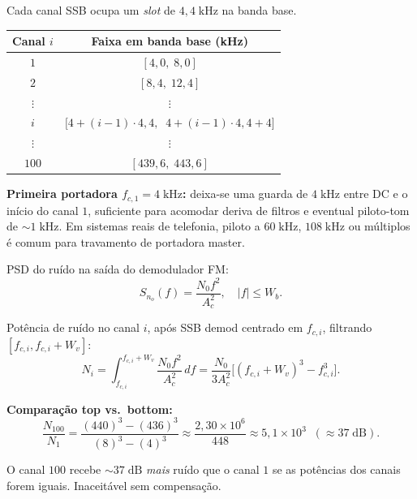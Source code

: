 \documentclass[11pt,a4paper]{article}
\begin{document}
\begin{resolucao}

Cada canal SSB ocupa um \emph{slot} de $4{,}4\;\text{kHz}$ na banda base.

\begin{center}
\begin{tabular}{cc}
\toprule
Canal $i$ & Faixa em banda base (kHz) \\
\midrule
$1$ & $[4{,}0,\;8{,}0]$ \\
$2$ & $[8{,}4,\;12{,}4]$ \\
$\vdots$ & $\vdots$ \\
$i$ & $\big[4 + (i-1)\cdot 4{,}4,\;\;4 + (i-1)\cdot 4{,}4 + 4\big]$ \\
$\vdots$ & $\vdots$ \\
$100$ & $[439{,}6,\;443{,}6]$ \\
\bottomrule
\end{tabular}
\end{center}

\textbf{Primeira portadora $f_{c,1} = 4\;\text{kHz}$:} deixa-se uma guarda de $4\;\text{kHz}$ entre DC e o início do canal $1$, suficiente para acomodar deriva de filtros e eventual piloto-tom de $\sim 1\;\text{kHz}$. Em sistemas reais de telefonia, piloto a $60\;\text{kHz}$, $108\;\text{kHz}$ ou múltiplos é comum para travamento de portadora master.
\end{resolucao}

\begin{resolucao}

PSD do ruído na saída do demodulador FM:
\[
  S_{n_o}(f) = \frac{N_0 f^2}{A_c^2}, \quad |f| \le W_b.
\]

Potência de ruído no canal $i$, após SSB demod centrado em $f_{c,i}$, filtrando $[f_{c,i}, f_{c,i} + W_v]$:
\[
  N_i = \int_{f_{c,i}}^{f_{c,i} + W_v}\!\!\!\!\!\frac{N_0 f^2}{A_c^2}\,df
      = \frac{N_0}{3 A_c^2}\big[(f_{c,i}+W_v)^3 - f_{c,i}^3\big].
\]

\textbf{Comparação top vs.\ bottom:}
\[
  \frac{N_{100}}{N_1} = \frac{(440)^3 - (436)^3}{(8)^3 - (4)^3} \approx \frac{2{,}30\times 10^6}{448}
                    \approx 5{,}1\times 10^3 \;\;(\approx 37\;\text{dB}).
\]

O canal $100$ recebe $\sim 37\;\text{dB}$ \emph{mais} ruído que o canal $1$ se as potências dos canais forem iguais. Inaceitável sem compensação.
\end{resolucao}
\end{document}
